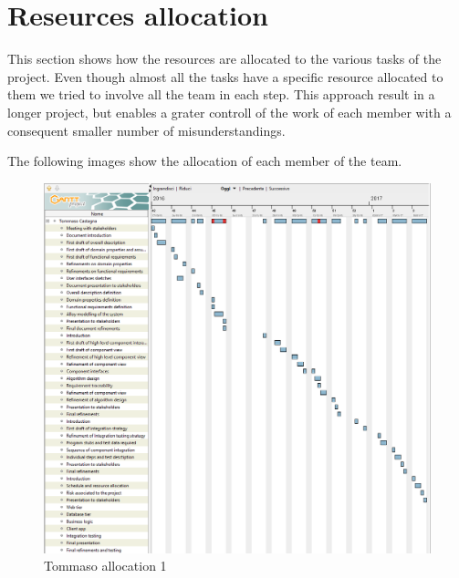 \section{Reseurces allocation}

This section shows how the resources are allocated to the various tasks of the
project. Even though almost all the tasks have a specific resource allocated to
them we tried to involve all the team in each step. This approach result in a
longer project, but enables a grater controll of the work of each member with a
consequent smaller number of misunderstandings.

The following images show the allocation of each member of the team.

\begin{figure}[H]
	\centerline{
	\includegraphics[width=500px]{../Datas/images/resource-tommaso-1.png}
	}
	\caption{Tommaso allocation 1}
		\label{fig:tasks-1}
\end{figure}

